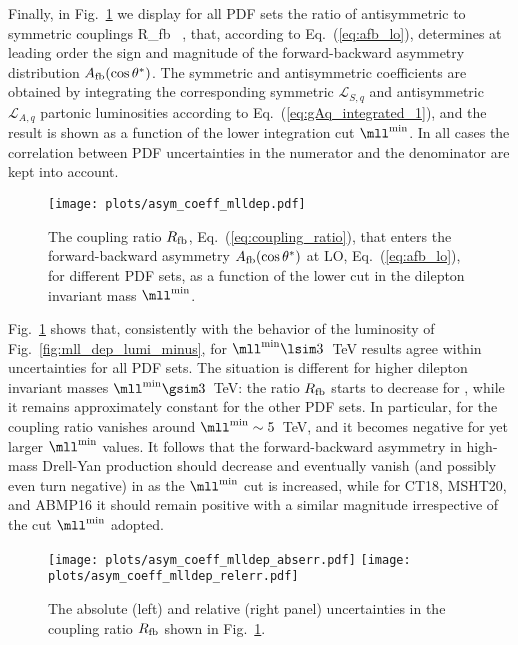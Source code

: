 Finally, in Fig.~\ref{fig:asym_coeff_mlldep} we display for all
PDF sets the
ratio of antisymmetric to symmetric couplings
\be
\label{eq:coupling_ratio}
R_{\rm fb}\equiv {} \, ,
\ee
that, according to
Eq.~(\ref{eq:afb_lo}), determines at leading order
the sign and magnitude
of the forward-backward asymmetry distribution $A_{\rm fb}(\cos\theta^*)$.
%
The symmetric and antisymmetric coefficients are obtained by integrating
the corresponding symmetric $\mathcal{L}_{S,q}$ and antisymmetric
$\mathcal{L}_{A,q}$ partonic luminosities according to
Eq.~(\ref{eq:gAq_integrated_1}), and the result is shown as a function of the lower integration cut $\mll^{\rm min}$.
%
In all cases the correlation between PDF uncertainties in the numerator and
the denominator are kept into account.

\begin{figure}[!t]
 \centering
 \texttt{[image: plots/asym\_coeff\_mlldep.pdf]}
 \caption{The coupling ratio $R_{\rm fb}$,
   Eq.~(\ref{eq:coupling_ratio}),
   that enters the forward-backward asymmetry $A_{\rm
     fb}(\cos\theta^*)$ at LO,  Eq.~(\ref{eq:afb_lo}), for different PDF
   sets, as  a function of the lower cut in the dilepton
   invariant mass $\mll^{\rm min}$.
 }    
 \label{fig:asym_coeff_mlldep}
\end{figure}

Fig.~\ref{fig:asym_coeff_mlldep} shows that, consistently
with the behavior of the luminosity of
Fig.~\ref{fig:mll_dep_lumi_minus},  for $\mll^{{\rm
    min}}\lsim 3$~TeV results agree within uncertainties for all PDF
sets.
%
The situation is different for higher dilepton invariant masses $\mll^{{\rm min}}\gsim 3$~TeV:
the ratio $R_{\rm fb}$ starts to decrease for , while it
remains approximately  constant 
for the other  PDF sets. In particular, for  the coupling ratio
vanishes around $\mll^{{\rm min}}\sim5$~TeV, and it becomes negative
for yet larger   $\mll^{{\rm min}}$ values.
It follows that the forward-backward
asymmetry in high-mass Drell-Yan production should decrease  and
eventually vanish (and possibly even turn negative)
in  as the $\mll^{{\rm min}}$ cut is increased,
while for CT18, MSHT20, and ABMP16 it should remain positive
with a similar magnitude irrespective of the cut  $\mll^{{\rm min}}$ adopted.

\begin{figure}[!t]
 \centering
 \texttt{[image: plots/asym\_coeff\_mlldep\_abserr.pdf]}
 \texttt{[image: plots/asym\_coeff\_mlldep\_relerr.pdf]}
 \caption{The absolute (left) and relative (right panel) uncertainties
   in the coupling ratio $R_{\rm fb}$ shown in Fig.~\ref{fig:asym_coeff_mlldep}.
 }    
 \label{fig:asym_coeff_mlldep_err}
\end{figure}

